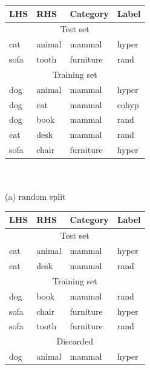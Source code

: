 \begin{table}
  \begin{minipage}[b]{6cm}
  \centering
  \begin{tabular}{|llll|}
    \hline
    {\bf LHS} & {\bf RHS} & {\bf Category} & {\bf Label} \\
    \hline
    \hline
    \multicolumn{4}{|c|}{Test set}\\
    \hline
    cat       &  animal   &  mammal        & hyper       \\
    sofa      &  tooth    &  furniture     & rand        \\
    \hline
    \hline
    \multicolumn{4}{|c|}{Training set}\\
    \hline
    dog       &  animal   &  mammal        & hyper       \\
    dog       &  cat      &  mammal        & cohyp       \\
    dog       &  book     &  mammal        & rand        \\
    cat       &  desk     &  mammal        & rand        \\
    sofa      &  chair    &  furniture     & hyper       \\
    \hline
  \end{tabular}\\~\\{\small (a) random split}
  \end{minipage}
  \qquad\quad
  \begin{minipage}[b]{6cm}
    \centering
  \begin{tabular}{|llll|}
    \hline
    {\bf LHS} & {\bf RHS} & {\bf Category} & {\bf Label} \\
    \hline
    \hline
    \multicolumn{4}{|c|}{Test set}\\
    \hline
    cat       &  animal   &  mammal        & hyper       \\
    cat       &  desk     &  mammal        & rand        \\
    \hline
    \hline
    \multicolumn{4}{|c|}{Training set}\\
    \hline
    dog       &  book     &  mammal        & rand        \\
    sofa      &  chair    &  furniture     & hyper       \\
    sofa      &  tooth    &  furniture     & rand        \\
    \hline
    \hline
    \multicolumn{4}{|c|}{Discarded}\\
    \hline
    dog       &  animal   &  mammal        & hyper       \\

\end{tabular}
\end{minipage}
\end{table}
